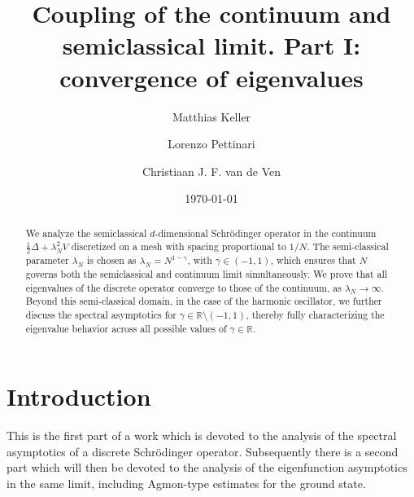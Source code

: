 \documentclass[12pt, reqno]{amsart}
\theoremstyle{definition}
\numberwithin{equation}{section}
\begin{document}
\date{\today}


\author[M. Keller]{Matthias Keller}
\address{M. Keller: Israel Institute of Advanced Studies (IIAS), The Hebrew University of Jerusalem, Edmond J. Safra Campus, Givat Ram, Jerusalem, Israel}
\address{Institut f\"ur Mathematik, Universit\"at Potsdam, 14476 Potsdam, Germany}

\author[L. Pettinari]{Lorenzo Pettinari}
\address{L. Pettinari: Dipartimento di Matematica, Universit\`a di Trento and INFN-TIFPA and INdAM, Via Sommarive 14, I-38123 Povo, Italy}

\author[C. J. F. van de Ven]{Christiaan J. F. van de Ven}
\address{C. J. F. van de Ven: Friedrich-Alexander-Universit\"at Erlangen-N\"urnberg, Department of Mathematics, Cauerstra\ss e 11, 91058 Erlangen, Germany}


\title[Convergence of eigenvalues]{Coupling of the continuum and semiclassical limit. Part I: convergence of eigenvalues}


\begin{abstract}
\noindent
We analyze the semiclassical  $d$-dimensional Schr\"{o}\-ding\-er operator in the continuum $ \frac{1}{2} \Delta + \lambda_N^2 V$
discretized on a mesh with spacing proportional to $1/N$. The semi-classical parameter $\lambda_N$ is chosen as $\lambda_N = N^{1 - \gamma}$, with $\gamma \in (-1,1)$, which ensures that $N$ governs both the semiclassical and continuum limit simultaneously. We prove that all eigenvalues of the discrete operator converge to those of the continuum, as $\lambda_N\to\infty$. Beyond this semi-classical domain, in the case of the harmonic oscillator, we further discuss the spectral asymptotics for $\gamma \in \mathbb{R} \setminus (-1,1)$, thereby fully characterizing the eigenvalue behavior across all possible values of $\gamma\in\mathbb{R}$.
\end{abstract}

\maketitle

\tableofcontents
\section{Introduction}
This is the first part of a work which is devoted
to the analysis of the spectral asymptotics of a discrete Schr\"{o}dinger operator. Subsequently there is a second part \cite{Keller_Pettinari_Ven_Part2} which will then be devoted to the analysis of the eigenfunction asymptotics in the same limit, including Agmon-type estimates for the ground state.
\end{document}
